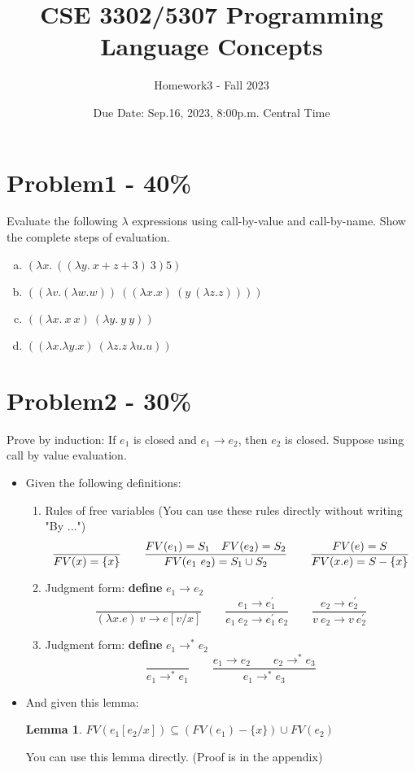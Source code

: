 \documentclass{article}
\newtheorem{lemma}[thm]{Lemma}
\begin{document}
\title{CSE 3302/5307 Programming Language Concepts}
\author{Homework3 - Fall 2023}
\date{Due Date: Sep.16, 2023, 8:00p.m. Central Time}
\maketitle
\thispagestyle{fancy}


\section*{Problem1 - 40\%}

Evaluate the following $\lambda$ expressions using call-by-value and call-by-name. Show the complete steps of evaluation.
\begin{enumerate}[(a)]
    \item $(\lambda x.\ ((\lambda y.\ x+z+3 )\ 3 )5)$
    \item $((\lambda v.(\lambda w.w))\ ((\lambda x.x)\ (y\ (\lambda z.z))))$
    \item $((\lambda x.\ x\ x)\ (\lambda y.\ y\ y))$
    \item $((\lambda x. \lambda y. x)\ (\lambda z.z\ \lambda u.u))$
\end{enumerate}

\section*{Problem2 - 30\%}

Prove by induction: If $e_{1}$ is closed and $e_{1} \rightarrow e_{2}$, then $e_{2}$ is closed.
Suppose using call by value evaluation. 
\begin{itemize}
\item Given the following definitions:
\begin{enumerate}
    \item Rules of free variables (You can use these rules directly without writing "By ...")
    \[
    \frac{}{FV(x)=\{x\}} \qquad
    \frac{FV(e_1) = S_1\quad FV(e_2) = S_2}{FV(e_1\ e_2)=S_1\cup S_2} \qquad
    \frac{FV(e) = S}{FV(\\x.e)=S-\{x\}}
    \]
    \item Judgment form: \textbf{define} $e_1\rightarrow e_2$
    \[
    \frac{}{(\lambda x.e)\ v \rightarrow e [v/x]}
    \qquad
    \frac{e_1 \rightarrow e_1^{'}}{e_1\ e_2 \rightarrow e_1^{'}\ e_2}
    \qquad
    \frac{e_2 \rightarrow e_2^{'}}{v\ e_2 \rightarrow v\ e_2^{'}}
    \]
    
    \item Judgment form: \textbf{define} $e_1{\rightarrow}^*e_2$
    \[
    \frac{}{e_1\rightarrow^* e_1}
    \qquad
    \frac{e_1\rightarrow e_2\qquad e_2\rightarrow^*e_3}{e_1\rightarrow^*e_3}
    \]
\end{enumerate}
\newpage
\item And given this lemma:
    \begin{lemma}\label{fv}
        $FV(e_1[e_2/x]) \subseteq (FV(e_1) - \{x\}) \cup FV(e_2)$
    \end{lemma}
You can use this lemma directly. (Proof is in the appendix)
\end{itemize}
\vspace{20pt}
\end{document}
